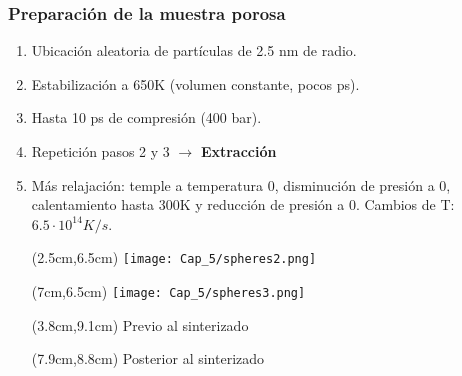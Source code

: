 
\begin{frame}
    \frametitle{Preparaci\'on de la muestra porosa}
    \vspace{0cm}
    \begin{enumerate}
        \item Ubicaci\'on aleatoria de part\'iculas de 2.5 nm de radio.
        \item Estabilización a 650K (volumen constante, pocos ps). 
        \item Hasta 10 ps de compresi\'on (400 bar).
        \item Repetición pasos 2 y 3 $\rightarrow$ \textbf{Extracción}
        \item M\'as relajaci\'on: temple a temperatura 0, disminución de presi\'on a 0, calentamiento hasta 300K y reducción de presi\'on a 0. Cambios de T: $6.5 \cdot 10^{14} K/s$.
        \begin{textblock*}{3cm}(2.5cm,6.5cm) %
            \texttt{[image: Cap\_5/spheres2.png]}
        \end{textblock*}
        \begin{textblock*}{3cm}(7cm,6.5cm) %
            \texttt{[image: Cap\_5/spheres3.png]}
        \end{textblock*}
        \begin{textblock*}{3cm}(3.8cm,9.1cm)
         \scriptsize{Previo al sinterizado}
        \end{textblock*}
        \begin{textblock*}{3cm}(7.9cm,8.8cm)
         \scriptsize{Posterior al sinterizado}         
        \end{textblock*}
    \end{enumerate}
\end{frame}


